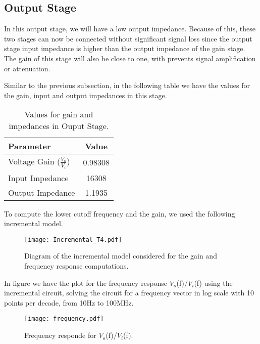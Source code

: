 \subsection{Output Stage}
\label{sec:output}


In this output stage, we will have a low output impedance. Because of this, these two stages can now be connected without significant signal loss since the output stage input impedance is higher than the output impedance of the gain stage. The gain of this stage will also be close to one, with prevents signal amplification or attenuation.

Similar to the previous subsection, in the following table we have the values for the gain, input and output impedances in this stage.

\begin{table}[h]
    \centering
    \begin{tabular}{|l|c|}
    \hline
    {\bf Parameter} & {\bf Value} \\ \hline \hline
    Voltage Gain ($\frac{V_{o}}{V_{i}}$)  & 0.98308\\ \hline
    Input Impedance & 16308\\ \hline
    Output Impedance  & 1.1935  \\ \hline
    \end{tabular}
    \caption{Values for gain and impedances in Ouput Stage.}
    \label{tab:values}
\end{table}

To compute the lower cutoff frequency and the gain, we used the following incremental model.

\begin{figure}[ht!] \centering
\texttt{[image: Incremental\_T4.pdf]}

\caption{Diagram of the incremental model considered for the gain and frequency response computations.}
\label{fig:diagram_t4}
\end{figure}



In figure we have the plot for the frequency response $V_o$(f)/$V_i$(f) using the incremental circuit, solving the circuit for a frequency vector in log scale with 10 points per decade, from 10Hz to 100MHz.

\begin{figure}[!ht] \centering
\squeezeup
\squeezeup
\squeezeup
\squeezeup
\squeezeup
\squeezeup
    \texttt{[image: frequency.pdf]}
    \squeezeup
    \squeezeup
    \squeezeup
    \squeezeup
    \squeezeup
    \squeezeup
    \caption{Frequency responde for $V_o$(f)/$V_i$(f).}
    \label{fig:output}
\end{figure}

